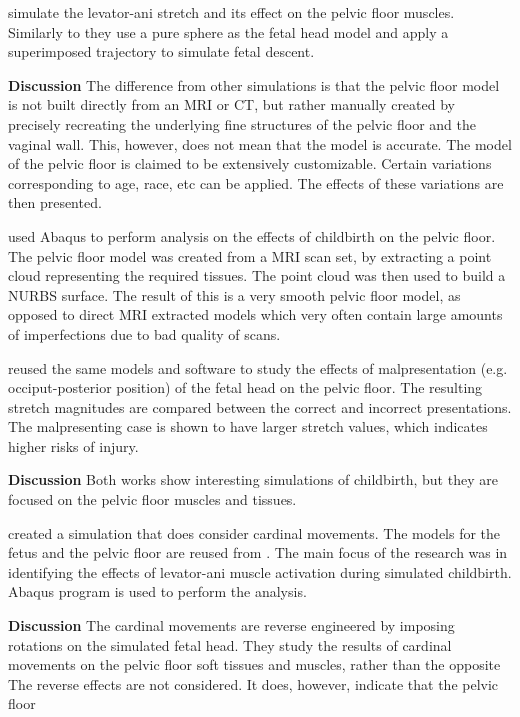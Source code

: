 \textbf{\citet{Lien2004}} simulate the levator-ani stretch and its effect on the pelvic floor muscles. Similarly to \citet{Hoyte2008} they use a pure sphere as the fetal head model and apply a superimposed trajectory to simulate fetal descent.

\textbf{Discussion } The difference from other simulations is that the pelvic floor model is not built directly from an MRI or CT, but rather manually created by precisely recreating the underlying fine structures of the pelvic floor and the vaginal wall. This, however, does not mean that the model is accurate. The model of the pelvic floor is claimed to be extensively customizable. Certain variations corresponding to age, race, etc can be applied. The effects of these variations are then presented.

\textbf{\citet{Parente2008}} used Abaqus to perform analysis on the effects of childbirth on the pelvic floor. The pelvic floor model was created from a MRI scan set, by extracting a point cloud representing the required tissues. The point cloud was then used to build a NURBS surface. The result of this is a very smooth pelvic floor model, as opposed to direct MRI extracted models which very often contain large amounts of imperfections due to bad quality of scans.

\textbf{\citet{Parente2009}} reused the same models and software to study the effects of malpresentation (e.g. occiput-posterior position) of the fetal head on the pelvic floor. The resulting stretch magnitudes are compared between the correct and incorrect presentations. The malpresenting case is shown to have larger stretch values, which indicates higher risks of injury.

\textbf{Discussion } Both works show interesting simulations of childbirth, but they are focused on the pelvic floor muscles and tissues.

\textbf{\citet{Martins2007}} created a simulation that does consider cardinal movements. The models for the fetus and the pelvic floor are reused from \cite{Parente2009}. The main focus of the research was in identifying the effects of levator-ani muscle activation during simulated childbirth. Abaqus program is used to perform the analysis.

\textbf{Discussion} The cardinal movements are reverse engineered by imposing rotations on the simulated fetal head. They study the results of cardinal movements on the pelvic floor soft tissues and muscles, rather than the opposite The reverse effects are not considered. It does, however, indicate that the pelvic floor

